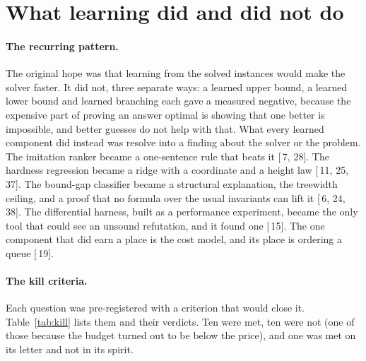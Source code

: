 \documentclass[11pt,a4paper]{article}
\renewcommand{\S}[1]{[\textsection\,#1]}
\begin{document}
\section{What learning did and did not do}
\label{sec:learning}

\paragraph{The recurring pattern.}
The original hope was that learning from the solved instances would make the
solver faster. It did not, three separate ways: a learned upper bound, a
learned lower bound and learned branching each gave a measured negative,
because the expensive part of proving an answer optimal is showing that one
better is impossible, and better guesses do not help with that. What every
learned component did instead was resolve into a finding about the solver or
the problem. The imitation ranker became a one-sentence rule that beats it
\S{7, 28}. The hardness regression became a ridge with a coordinate and a
height law \S{11, 25, 37}. The bound-gap classifier became a structural
explanation, the treewidth ceiling, and a proof that no formula over the usual
invariants can lift it \S{6, 24, 38}. The differential harness, built as a
performance experiment, became the only tool that could see an unsound
refutation, and it found one \S{15}. The one component that did earn a place
is the cost model, and its place is ordering a queue \S{19}.

\paragraph{The kill criteria.}
Each question was pre-registered with a criterion that would close it.
Table~\ref{tab:kill} lists them and their verdicts. Ten were met, ten were
not (one of those because the budget turned out to be below the price), and
one was met on its letter and not in its spirit.
\end{document}
